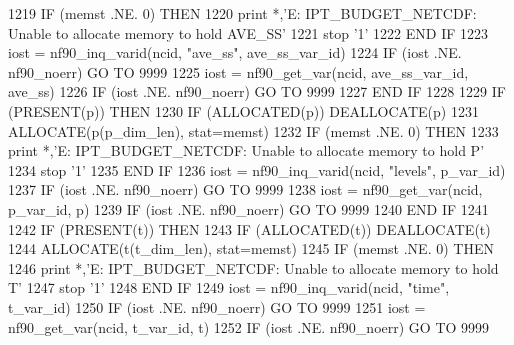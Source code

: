 \begin{DoxyCode}
1219         \textcolor{keywordflow}{IF} (memst .NE. 0) \textcolor{keywordflow}{THEN}
1220             print *,\textcolor{stringliteral}{'E: IPT\_BUDGET\_NETCDF: Unable to allocate memory to hold AVE\_SS'}
1221             stop \textcolor{stringliteral}{'1'}
1222 \textcolor{keywordflow}{        END IF}
1223         iost = nf90\_inq\_varid(ncid, \textcolor{stringliteral}{"ave\_ss"}, ave\_ss\_var\_id)
1224         \textcolor{keywordflow}{IF} (iost .NE. nf90\_noerr) \textcolor{keywordflow}{GO TO} 9999
1225         iost = nf90\_get\_var(ncid, ave\_ss\_var\_id, ave\_ss)
1226         \textcolor{keywordflow}{IF} (iost .NE. nf90\_noerr) \textcolor{keywordflow}{GO TO} 9999
1227 \textcolor{keywordflow}{    END IF}
1228 
1229     \textcolor{keywordflow}{IF} (\textcolor{keyword}{PRESENT}(p)) \textcolor{keywordflow}{THEN}
1230         \textcolor{keywordflow}{IF} (\textcolor{keyword}{ALLOCATED}(p))         \textcolor{keyword}{DEALLOCATE}(p)
1231         \textcolor{keyword}{ALLOCATE}(p(p\_dim\_len), stat=memst)
1232         \textcolor{keywordflow}{IF} (memst .NE. 0) \textcolor{keywordflow}{THEN}
1233             print *,\textcolor{stringliteral}{'E: IPT\_BUDGET\_NETCDF: Unable to allocate memory to hold P'}
1234             stop \textcolor{stringliteral}{'1'}
1235 \textcolor{keywordflow}{        END IF}
1236         iost = nf90\_inq\_varid(ncid, \textcolor{stringliteral}{"levels"}, p\_var\_id)
1237         \textcolor{keywordflow}{IF} (iost .NE. nf90\_noerr) \textcolor{keywordflow}{GO TO} 9999
1238         iost = nf90\_get\_var(ncid, p\_var\_id, p)
1239         \textcolor{keywordflow}{IF} (iost .NE. nf90\_noerr) \textcolor{keywordflow}{GO TO} 9999
1240 \textcolor{keywordflow}{    END IF}
1241 
1242     \textcolor{keywordflow}{IF} (\textcolor{keyword}{PRESENT}(t)) \textcolor{keywordflow}{THEN}
1243         \textcolor{keywordflow}{IF} (\textcolor{keyword}{ALLOCATED}(t))           \textcolor{keyword}{DEALLOCATE}(t)
1244         \textcolor{keyword}{ALLOCATE}(t(t\_dim\_len), stat=memst)
1245         \textcolor{keywordflow}{IF} (memst .NE. 0) \textcolor{keywordflow}{THEN}
1246             print *,\textcolor{stringliteral}{'E: IPT\_BUDGET\_NETCDF: Unable to allocate memory to hold T'}
1247             stop \textcolor{stringliteral}{'1'}
1248 \textcolor{keywordflow}{        END IF}
1249         iost = nf90\_inq\_varid(ncid, \textcolor{stringliteral}{"time"}, t\_var\_id)
1250         \textcolor{keywordflow}{IF} (iost .NE. nf90\_noerr) \textcolor{keywordflow}{GO TO} 9999
1251         iost = nf90\_get\_var(ncid, t\_var\_id, t)
1252         \textcolor{keywordflow}{IF} (iost .NE. nf90\_noerr) \textcolor{keywordflow}{GO TO} 9999

\end{DoxyCode}
